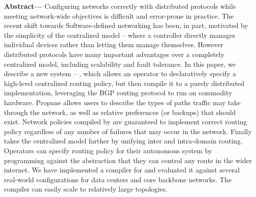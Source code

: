 \textbf{Abstract---}
Configuring networks correctly with distributed protocols while meeting network-wide objectives is difficult and error-prone in practice.
The recent shift towards Software-defined networking has been, in part, motivated by the simplicity of the centralized model -- where a controller directly manages individual devices rather than letting them manage themselves. However distributed protocols have many important advantages over a completely centralized model, including scalability and fault tolerance.
%
In this paper, we describe a new system -- \sysname, which allows an operator to declaratively specify a high-level centralized routing policy, but then compile it to a purely distributed implementation, leveraging the BGP routing protocol to run on commodity hardware. 
%
Propane allows users to describe the types of paths traffic may take through the network, as well as relative preferences (or backups) that should exist. 
%
Network policies compiled by \sysname are guaranteed to implement correct routing policy regardless of any number of failures that may occur in the network. 
%
Finally \sysname takes the centralized model farther by unifying inter and intra-domain routing. Operators can specify routing policy for their autonomous system by programming against the abstraction that they can control any route in the wider internet.
%
We have implemented a compiler for \sysname and evaluated it against several real-world configurations for data centers and core backbone networks. The \sysname compiler can easily scale to relatively large topologies.